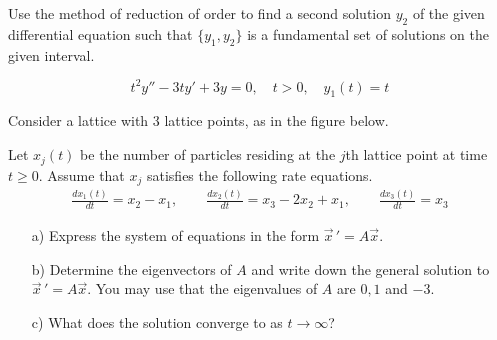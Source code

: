 \documentclass[12pt]{exam}
\begin{document}
    


\newpage


\InitialsRight

\begin{questions}

    \question[8] 
    Use the method of reduction of order to ﬁnd a second solution $y_2$ of the given diﬀerential equation such that $\{ y_1 , y_2 \}$ is a fundamental set of solutions on the given interval.
    
    $$t^2y'' - 3ty' + 3y = 0, \quad t > 0, \quad y_1(t) = t$$
    
    \newpage    \InitialsLeft
    
        \question[9] Consider a lattice with $3$ lattice points, as in the figure below. 
    
        \begin{center}
        \end{center}  
        
        Let $x_j(t)$ be the number of particles residing at the $j$th lattice point at time $t \ge 0$. Assume that $x_j$ satisfies the following rate equations.
        \begin{align*} 
            \frac{dx_1(t)}{dt} = x_2 - x_1 , \qquad 
            \frac{dx_2(t)}{dt} = x_3 - 2 x_2 + x_1 , \qquad \frac{dx_3(t)}{dt} = x_3
        \end{align*} 
        \begin{enumerate} 
            \item[a)] Express the system of equations in the form $\vec x \, ' = A \vec x$. 
                \vspace{2cm}

                \item[b)] Determine the eigenvectors of $A$ and write down the general solution to $\vec x \, ' = A\vec x$. You may use that the eigenvalues of $A$ are $0, 1$ and $-3$. 
                \vspace{10cm} 
                \item[c)] What does the solution converge to as $t \to \infty$? 
        \end{enumerate}
        

\end{questions}
\end{document}
